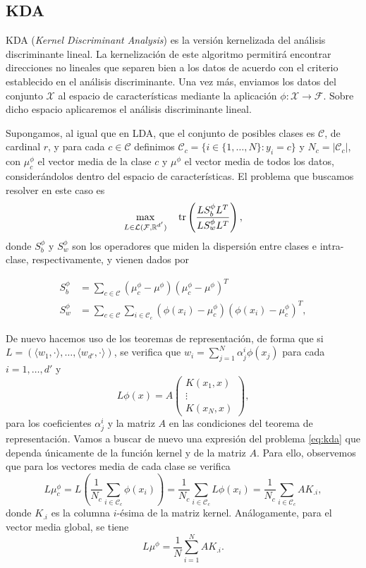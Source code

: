 \subsection{KDA}

KDA (\emph{Kernel Discriminant Analysis}) \cite{kda} es la versión kernelizada del análisis discriminante lineal. La kernelización de este algoritmo permitirá encontrar direcciones no lineales que separen bien a los datos de acuerdo con el criterio establecido en el análisis discriminante. Una vez más, enviamos los datos del conjunto $\mathcal{X}$ al espacio de características mediante la aplicación $\phi \colon \mathcal{X} \to \mathcal{F}$. Sobre dicho espacio aplicaremos el análisis discriminante lineal.

Supongamos, al igual que en LDA, que el conjunto de posibles clases es $\mathcal{C}$, de cardinal $r$, y para cada $c \in \mathcal{C}$ definimos $\mathcal{C}_c = \{i \in \{1,\dots,N\} \colon y_i = c\}$ y $N_c = |\mathcal{C}_c|$, con $\mu_c^{\phi}$ el vector media de la clase $c$ y $\mu^{\phi}$ el vector media de todos los datos, considerándolos dentro del espacio de características. El problema que buscamos resolver en este caso es
\begin{equation} \label{eq:kda}
    \max_{\substack{L \in \mathcal{L}(\mathcal{F}, \mathbb{R}^{d'}) }} \quad \operatorname{tr}\left(\frac{L S_b^{\phi} L^T}{LS_w^{\phi}L^T}\right),
\end{equation}
donde $S_b^{\phi}$ y $S_w^{\phi}$ son los operadores que miden la dispersión entre clases e intra-clase, respectivamente, y vienen dados por

\begin{align*}
    S_b^{\phi} &= \sum_{c \in \mathcal{C}}(\mu_c^{\phi} - \mu^{\phi})(\mu_c^{\phi} - \mu^{\phi})^T \\
    S_w^{\phi} &= \sum_{c \in \mathcal{C}}\sum_{i \in \mathcal{C}_c}(\phi(x_i)-\mu_c^{\phi})(\phi(x_i)-\mu_c^{\phi})^T,
\end{align*}

De nuevo hacemos uso de los teoremas de representación, de forma que si $L = (\langle w_1,\cdot\rangle, \dots, \langle w_{d'}, \cdot \rangle)$, se verifica que $w_i = \sum_{j=1}^N \alpha_j^i \phi(x_j)$ para cada $i = 1,\dots,d'$ y
\[L\phi(x) = A \begin{pmatrix} K(x_1,x) \\ \vdots \\ K(x_N,x) \end{pmatrix}, \]
para los coeficientes $\alpha_j^i$ y la matriz $A$ en las condiciones del teorema de representación. Vamos a buscar de nuevo una expresión del problema \ref{eq:kda} que dependa únicamente de la función kernel y de la matriz $A$. Para ello, observemos que para los vectores media de cada clase se verifica
\[ L\mu_c^{\phi} = L\left(\frac{1}{N_c} \sum_{i \in \mathcal{C}_c} \phi(x_i)\right) = \frac{1}{N_c}\sum_{i \in \mathcal{C}_c}L\phi(x_i) = \frac{1}{N_c}\sum_{i \in \mathcal{C}_c}AK_{.i},  \]
donde $K_{.i}$ es la columna $i$-ésima de la matriz kernel. Análogamente, para el vector media global, se tiene
\[ L\mu^{\phi} = \frac{1}{N} \sum_{i=1}^NAK_{.i}. \]

